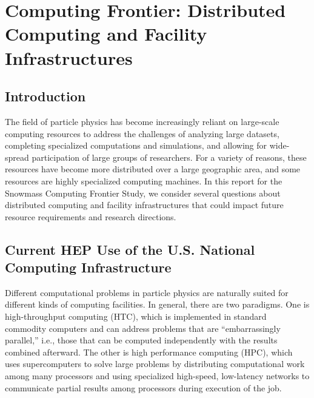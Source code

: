  
\chapter{Computing Frontier: Distributed Computing and Facility Infrastructures}
\label{chap:mag}


\begin{center}\begin{boldmath}



\end{boldmath}\end{center}


\section{Introduction}
\label{sec:comp-intro}

The field of particle physics has become increasingly reliant on large-scale computing resources to address the challenges of analyzing large datasets, completing specialized computations and simulations, and allowing for wide-spread participation of large groups of researchers.  For a variety of reasons, these resources have become more distributed over a large geographic area, and some resources are highly specialized computing machines.  In this report for the Snowmass Computing Frontier Study, we consider several questions about distributed computing and facility infrastructures that could impact future resource requirements and research directions.

\section{Current HEP Use of the U.S. National Computing Infrastructure}

Different computational problems in particle physics are naturally suited for different kinds of computing facilities.  In general, there are two paradigms.  One is high-throughput computing (HTC), which is implemented in standard commodity computers and can address problems that are “embarrassingly parallel,” i.e., those that can be computed independently with the results combined afterward.  The other is high performance computing (HPC), which uses supercomputers to solve large problems by distributing computational work among many processors and using specialized high-speed, low-latency networks to communicate partial results among processors during execution of the job.

